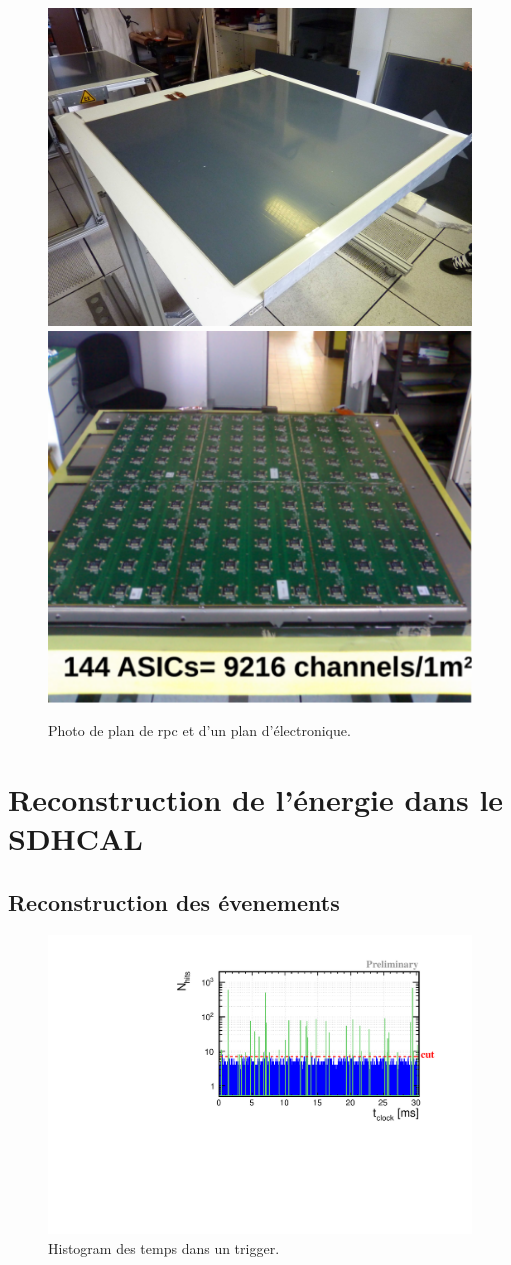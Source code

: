 \begin{figure}[!h]
  \begin{center}
    \includegraphics[width=.47\textwidth]{SDHCAL/figs/aLayer.jpg}
    \includegraphics[width=.4\textwidth]{SDHCAL/figs/layer_electronic2.pdf}
    \caption{Photo de plan de rpc et d'un plan d'électronique.}
    \label{fig:layer}
  \end{center}
\end{figure}


\section{Reconstruction de l'énergie dans le SDHCAL}

\subsection{Reconstruction des évenements}
\begin{figure}[!h]
  \begin{center}
    \includegraphics[width=.8\textwidth]{SDHCAL/figs/time_spectrum.pdf}
    \caption{Histogram des temps dans un trigger.}
    \label{fig:time_spectrum}
  \end{center}
\end{figure}

